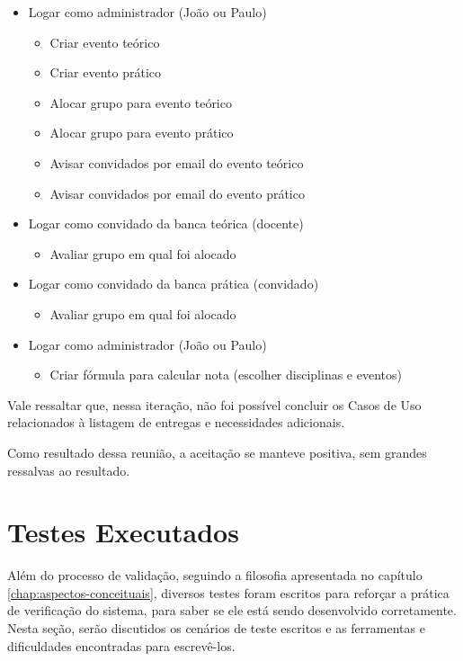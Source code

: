 \begin{itemize}
    \item Logar como administrador (João ou Paulo)
    \begin{itemize}
        \item Criar evento teórico
        \item Criar evento prático
        \item Alocar grupo para evento teórico
        \item Alocar grupo para evento prático
        \item Avisar convidados por email do evento teórico
        \item Avisar convidados por email do evento prático
    \end{itemize}
    
    \item Logar como convidado da banca teórica (docente)
    \begin{itemize}
        \item Avaliar grupo em qual foi alocado
    \end{itemize}
    
    \item Logar como convidado da banca prática (convidado)
    \begin{itemize}
        \item Avaliar grupo em qual foi alocado
    \end{itemize}
    
    \item Logar como administrador (João ou Paulo)
    \begin{itemize}
        \item Criar fórmula para calcular nota (escolher disciplinas e eventos)
    \end{itemize}
\end{itemize}

Vale ressaltar que, nessa iteração, não foi possível concluir os Casos de Uso relacionados à listagem de entregas e necessidades adicionais.

Como resultado dessa reunião, a aceitação se manteve positiva, sem grandes ressalvas ao resultado.

\section{Testes Executados}
Além do processo de validação, seguindo a filosofia apresentada no capítulo \ref{chap:aspectos-conceituais}, diversos testes foram escritos para reforçar a prática de verificação do sistema, para saber se ele está sendo desenvolvido corretamente. Nesta seção, serão discutidos os cenários de teste escritos e as ferramentas e dificuldades encontradas para escrevê-los.


